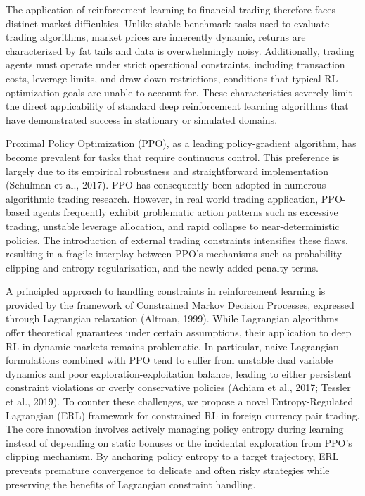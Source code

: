 \documentclass[12pt,a4paper]{article}
\begin{document}
The application of reinforcement learning to financial trading therefore faces distinct market difficulties. Unlike stable benchmark tasks used to evaluate trading algorithms, market prices are inherently dynamic, returns are characterized by fat tails and data is overwhelmingly noisy. Additionally, trading agents must operate under strict operational constraints, including transaction costs, leverage limits, and draw-down restrictions, conditions that typical RL optimization goals are unable to account for. These characteristics severely limit the direct applicability of standard deep reinforcement learning algorithms that have demonstrated success in stationary or simulated domains.

Proximal Policy Optimization (PPO), as a leading policy-gradient algorithm, has become prevalent for tasks that require continuous control. This preference is largely due to its empirical robustness and straightforward implementation (Schulman et al., 2017). PPO has consequently been adopted in numerous algorithmic trading research. However, in real world trading application, PPO-based agents frequently exhibit problematic action patterns such as excessive trading, unstable leverage allocation, and rapid collapse to near-deterministic policies. The introduction of external trading constraints intensifies these flaws, resulting in a fragile interplay between PPO's mechanisms such as probability clipping and entropy regularization, and the newly added penalty terms.

A principled approach to handling constraints in reinforcement learning is provided by the framework of Constrained Markov Decision Processes, expressed through Lagrangian relaxation (Altman, 1999). While Lagrangian algorithms offer theoretical guarantees under certain assumptions, their application to deep RL in dynamic markets remains problematic. In particular, naive Lagrangian formulations combined with PPO tend to suffer from unstable dual variable dynamics and poor exploration-exploitation balance, leading to either persistent constraint violations or overly conservative policies (Achiam et al., 2017; Tessler et al., 2019). To counter these challenges, we propose a novel Entropy-Regulated Lagrangian (ERL) framework for constrained RL in foreign currency pair trading. The core innovation involves actively managing policy entropy during learning instead of depending on static bonuses or the incidental exploration from PPO's clipping mechanism. By anchoring policy entropy to a target trajectory, ERL prevents premature convergence to delicate and often risky strategies while preserving the benefits of Lagrangian constraint handling.
\end{document}

